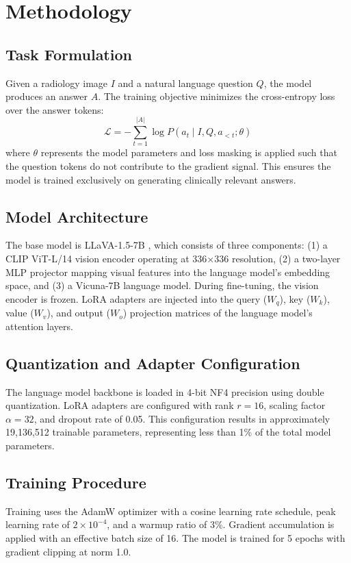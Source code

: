 \section{Methodology}
\label{sec:methodology}

\subsection{Task Formulation}

Given a radiology image $I$ and a natural language question $Q$, the model produces an answer $A$. The training objective minimizes the cross-entropy loss over the answer tokens:
\begin{equation}
\mathcal{L} = -\sum_{t=1}^{|A|} \log P(a_t \mid I, Q, a_{<t}; \theta)
\end{equation}
where $\theta$ represents the model parameters and loss masking is applied such that the question tokens do not contribute to the gradient signal. This ensures the model is trained exclusively on generating clinically relevant answers.

\subsection{Model Architecture}

The base model is LLaVA-1.5-7B \cite{liu2024improved}, which consists of three components: (1) a CLIP ViT-L/14 vision encoder operating at 336$\times$336 resolution, (2) a two-layer MLP projector mapping visual features into the language model's embedding space, and (3) a Vicuna-7B language model. During fine-tuning, the vision encoder is frozen. LoRA adapters are injected into the query ($W_q$), key ($W_k$), value ($W_v$), and output ($W_o$) projection matrices of the language model's attention layers.

\subsection{Quantization and Adapter Configuration}

The language model backbone is loaded in 4-bit NF4 precision using double quantization. LoRA adapters are configured with rank $r = 16$, scaling factor $\alpha = 32$, and dropout rate of 0.05. This configuration results in approximately 19,136,512 trainable parameters, representing less than 1\% of the total model parameters.

\subsection{Training Procedure}

Training uses the AdamW optimizer with a cosine learning rate schedule, peak learning rate of $2 \times 10^{-4}$, and a warmup ratio of 3\%. Gradient accumulation is applied with an effective batch size of 16. The model is trained for 5 epochs with gradient clipping at norm 1.0.
